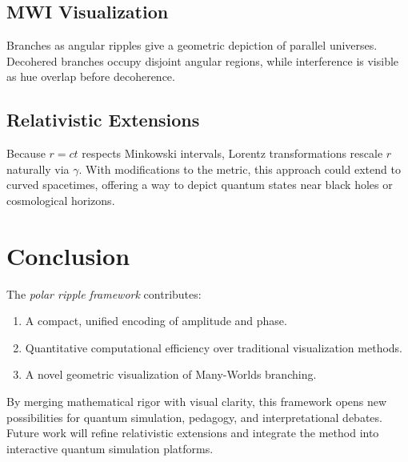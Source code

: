 \documentclass{article}
\begin{document}
\subsection{MWI Visualization}
Branches as angular ripples give a geometric depiction of parallel universes. Decohered branches occupy disjoint angular regions, while interference is visible as hue overlap before decoherence.

\subsection{Relativistic Extensions}
Because $r=ct$ respects Minkowski intervals, Lorentz transformations rescale $r$ naturally via $\gamma$. With modifications to the metric, this approach could extend to curved spacetimes, offering a way to depict quantum states near black holes or cosmological horizons.

\section{Conclusion}
The \emph{polar ripple framework} contributes:
\begin{enumerate}
    \item A compact, unified encoding of amplitude and phase.  
    \item Quantitative computational efficiency over traditional visualization methods.  
    \item A novel geometric visualization of Many-Worlds branching.  
\end{enumerate}
By merging mathematical rigor with visual clarity, this framework opens new possibilities for quantum simulation, pedagogy, and interpretational debates. Future work will refine relativistic extensions and integrate the method into interactive quantum simulation platforms.



\end{document}
